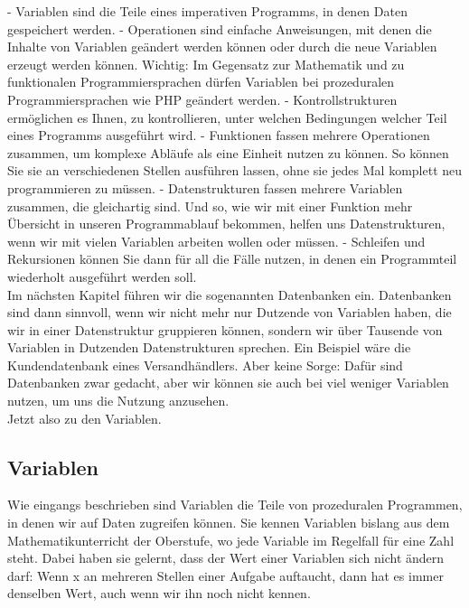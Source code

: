 -	Variablen sind die Teile eines imperativen Programms, in denen Daten gespeichert werden.
-	Operationen sind einfache Anweisungen, mit denen die Inhalte von Variablen geändert werden können oder durch die neue Variablen erzeugt werden können. Wichtig: Im Gegensatz zur Mathematik und zu funktionalen Programmiersprachen dürfen Variablen bei prozeduralen Programmiersprachen wie PHP geändert werden.
-	Kontrollstrukturen ermöglichen es Ihnen, zu kontrollieren, unter welchen Bedingungen welcher Teil eines Programms ausgeführt wird.
-	Funktionen fassen mehrere Operationen zusammen, um komplexe Abläufe als eine Einheit nutzen zu können. So können Sie sie an verschiedenen Stellen ausführen lassen, ohne sie jedes Mal komplett neu programmieren zu müssen.
-	Datenstrukturen fassen mehrere Variablen zusammen, die gleichartig sind. Und so, wie wir mit einer Funktion mehr Übersicht in unseren Programmablauf bekommen, helfen uns Datenstrukturen, wenn wir mit vielen Variablen arbeiten wollen oder müssen.
-	Schleifen und Rekursionen können Sie dann für all die Fälle nutzen, in denen ein Programmteil wiederholt ausgeführt werden soll.\\

Im nächsten Kapitel führen wir die sogenannten Datenbanken ein. Datenbanken sind dann sinnvoll, wenn wir nicht mehr nur Dutzende von Variablen haben, die wir in einer Datenstruktur gruppieren können, sondern wir über Tausende von Variablen in Dutzenden Datenstrukturen sprechen. Ein Beispiel wäre die Kundendatenbank eines Versandhändlers. Aber keine Sorge: Dafür sind Datenbanken zwar gedacht, aber wir können sie auch bei viel weniger Variablen nutzen, um uns die Nutzung anzusehen.\\

Jetzt also zu den Variablen.

\subsection{Variablen}

Wie eingangs beschrieben sind Variablen die Teile von prozeduralen Programmen, in denen wir auf Daten zugreifen können. Sie kennen Variablen bislang aus dem Mathematikunterricht der Oberstufe, wo jede Variable im Regelfall für eine Zahl steht. Dabei haben sie gelernt, dass der Wert einer Variablen sich nicht ändern darf: Wenn x an mehreren Stellen einer Aufgabe auftaucht, dann hat es immer denselben Wert, auch wenn wir ihn noch nicht kennen.\\

